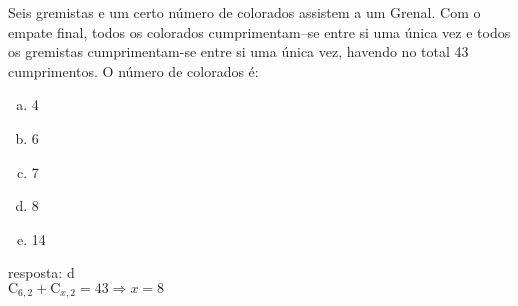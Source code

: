 \begin{ex}
  Seis gremistas e um certo número de colorados assistem a um Grenal. Com o empate final, todos os colorados cumprimentam–se entre si uma única vez e todos os gremistas  cumprimentam-se entre si uma única vez, havendo no total 43 cumprimentos. O número de colorados é:
    \begin{enumerate}[(a)]
    \item 4
    \item 6
    \item 7
    \item 8
    \item 14
    \end{enumerate}   
      \begin{sol}
        resposta: d \\
        $\mathrm{C}_{6,2}+\mathrm{C}_{x,2}=43 \Longrightarrow x = 8$
      \end{sol}
\end{ex}